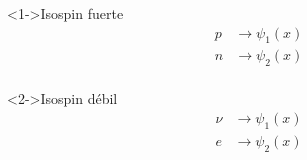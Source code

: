 \documentclass[%
xcolor=pdftex,dvipsnames,table%
]{beamer}
\begin{document}
{
\begin{frame}[plain]
\end{frame}
}

{
\begin{frame}[plain]
  \begin{block}<1->{Isospin fuerte}
    \begin{align*}
      p&\to \psi_1(x)\\
      n&\to \psi_2(x)\\
    \end{align*}
  \end{block}
  \begin{block}<2->{Isospin débil}
    \begin{align*}
      \nu&\to \psi_1(x)\\
      e&\to \psi_2(x)\\
    \end{align*}
  \end{block}

\end{frame}
}
\end{document}
